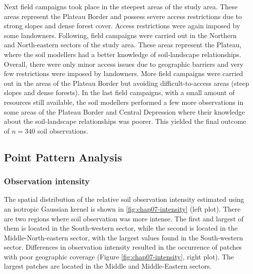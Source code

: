 Next field campaigns took place in the steepest areas of the study area. These areas represent the Plateau 
Border and possess severe access restrictions due to strong slopes and dense forest cover. Access restrictions 
were again imposed by some landowners. Following, field campaigns were carried out in the Northern and 
North-eastern sectors of the study area. These areas represent the Plateau, where the soil modellers had a 
better knowledge of soil-landscape relationships. Overall, there were only minor access issues due to 
geographic barriers and very few restrictions were imposed by landowners. More field campaigns were carried 
out in the areas of the Plateau Border but avoiding difficult-to-access areas (steep slopes and dense forests).
In the last field campaigns, with a small amount of resources still available, the soil modellers performed a 
few more observations in some areas of the Plateau Border and Central Depression where their knowledge about 
the 
soil-landscape relationships was poorer. This yielded the final outcome of $n = 340$ soil observations.

\subsection{Point Pattern Analysis}

\subsubsection{Observation intensity}

The spatial distribution of the relative soil observation intensity estimated using an isotropic Gaussian 
kernel is shown in \autoref{fig:chap07-intensity} (left plot). There are two regions where soil observation 
was 
more intense. The first and largest of them is located in the South-western sector, while the second is 
located in the Middle-North-eastern sector, with the largest values found in the South-western sector. 
Differences in observation intensity resulted in the occurrence of patches with poor 
geographic coverage (Figure \ref{fig:chap07-intensity}, right plot). The largest patches are 
located in the Middle and Middle-Eastern sectors.

